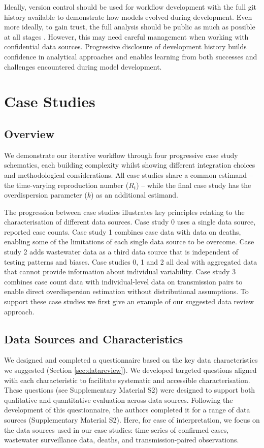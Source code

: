 \documentclass{article}
\begin{document}
Ideally, version control should be used for workflow development with the full git history available to demonstrate how models evolved during development.
Even more ideally, to gain trust, the full analysis should be public as much as possible at all stages \citep{Abbott2021-delta, Abbott2022-prevalence}.
However, this may need careful management when working with confidential data sources.
Progressive disclosure of development history builds confidence in analytical approaches and enables learning from both successes and challenges encountered during model development.

\section{Case Studies}

\subsection{Overview}

We demonstrate our iterative workflow through four progressive case study schematics, each building complexity whilst showing different integration choices and methodological considerations.
All case studies share a common estimand -- the time-varying reproduction number ($R_t$) -- while the final case study has the overdispersion parameter ($k$) as an additional estimand.

The progression between case studies illustrates key principles relating to the characterisation of different data sources. Case study 0 uses a single data source, reported case counts. Case study 1 combines case data with data on deaths, enabling some of the limitations of each single data source to be overcome. Case study 2 adds wastewater data as a third data source that is independent of testing patterns and biases. Case studies 0, 1 and 2 all deal with aggregated data that cannot provide information about individual variability. Case study 3 combines case count data with individual-level data on transmission pairs to enable direct overdispersion estimation without distributional assumptions.
To support these case studies we first give an example of our suggested data review approach.

\subsection{Data Sources and Characteristics}

We designed and completed a questionnaire based on the key data characteristics we suggested (Section \ref{sec:datareview}). We developed targeted questions aligned with each characteristic to facilitate systematic and accessible characterisation. These questions (see Supplementary Material S2) were designed to support both qualitative and quantitative evaluation across data sources. Following the development of this questionnaire, the authors completed it for a range of data sources (Supplementary Material S2). Here, for ease of interpretation, we focus on the data sources used in our case studies: time series of confirmed cases, wastewater surveillance data, deaths, and transmission-paired observations.
\end{document}
